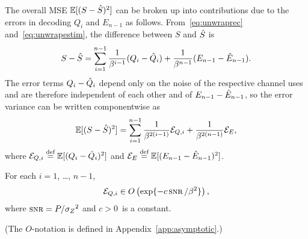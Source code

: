 The overall MSE $\mathbb{E}[(S-{\hat{S}})^2]$ can be broken up into contributions due to the
errors in decoding $Q_i$ and $E_{n-1}$ as follows. From~\eqref{eq:unwraprec}
and~\eqref{eq:unwrapestim}, the difference between $S$ and ${\hat{S}}$ is
\begin{equation*}
  S - {\hat{S}} = \sum_{i=1}^{n-1} \frac1{\beta^{i-1}} (Q_i - \hat{Q}_i) + \frac1{\beta^{n-1}}
  (E_{n-1} - \hat{E}_{n-1}).
\end{equation*}
The error terms $Q_i - \hat{Q}_i$ depend only on the noise of the respective channel
uses and are therefore independent of each other and of $E_{n-1} - \hat{E}_{n-1}$,
so the error variance can be written componentwise as
\begin{equation}
  \label{eq:totalerror}
  \mathbb{E}[(S-{\hat{S}})^2] = \sum_{i=1}^{n-1} \frac{1}{\beta^{2(i-1)}} {{\mathcal{E}}_{Q,i}} +
  \frac{1}{\beta^{2(n-1)}} {{\mathcal{E}}_E}, 
\end{equation}
where ${{\mathcal{E}}_{Q,i}} \stackrel{\text{def}}{=} \mathbb{E}[(Q_i - \hat{Q}_i)^2]$ and ${{\mathcal{E}}_E} \stackrel{\text{def}}{=} \mathbb{E}[(E_{n-1} -
\hat{E}_{n-1})^2]$.

\begin{lemma}
  \label{lem:eqbound}
  For each $i = 1$, \dots, $n-1$, 
  \begin{equation}
    \label{eq:eqidecay}
    \Eqi \in O\left(\exp\{-c \snr/\beta^2\}\right),
  \end{equation}
  where $\snr = P/\szq$ and $c > 0$~is a constant.
\end{lemma}
(The $O$-notation is defined in Appendix~\ref{app:asymptotic}.)

